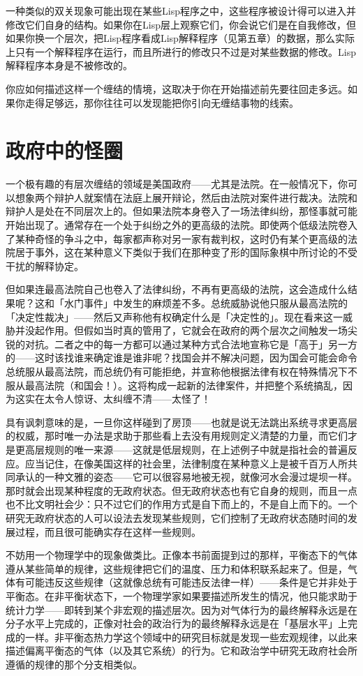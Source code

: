 \documentclass[
  12pt,
  twoside,
  openright,
  oldfontcommands,
]{memoir}
\begin{document}
一种类似的双关现象可能出现在某些Lisp程序之中，这些程序被设计得可以进入并修改它们自身的结构。如果你在Lisp层上观察它们，你会说它们是在自我修改，但如果你换一个层次，把Lisp程序看成Lisp解释程序（见第五章）的数据，那么实际上只有一个解释程序在运行，而且所进行的修改只不过是对某些数据的修改。Lisp解释程序本身是不被修改的。

你应如何描述这样一个缠结的情境，这取决于你在开始描述前先要往回走多远。如果你走得足够远，那你往往可以发现能把你引向无缠结事物的线索。

\section{政府中的怪圈}

一个极有趣的有层次缠结的领域是美国政府------尤其是法院。在一般情况下，你可以想象两个辩护人就案情在法庭上展开辩论，然后由法院对案件进行裁决。法院和辩护人是处在不同层次上的。但如果法院本身卷入了一场法律纠纷，那怪事就可能开始出现了。通常存在一个处于纠纷之外的更高级的法院。即使两个低级法院卷入了某种奇怪的争斗之中，每家都声称对另一家有裁判权，这时仍有某个更高级的法院居于事外，这在某种意义下类似于我们在那种变了形的国际象棋中所讨论的不受干扰的解释协定。

但如果连最高法院自己也卷入了法律纠纷，不再有更高级的法院，这会造成什么结果呢？这和「水门事件」中发生的麻烦差不多。总统威胁说他只服从最高法院的「决定性裁决」------然后又声称他有权确定什么是「决定性的」。现在看来这一威胁并没起作用。但假如当时真的管用了，它就会在政府的两个层次之间触发一场尖锐的对抗。二者之中的每一方都可以通过某种方式合法地宣称它是「高于」另一方的------这时该找谁来确定谁是谁非呢？找国会并不解决问题，因为国会可能会命令总统服从最高法院，而总统仍有可能拒绝，并宣称他根据法律有权在特殊情况下不服从最高法院（和国会！）。这将构成一起新的法律案件，并把整个系统搞乱，因为这实在太令人惊讶、太纠缠不清------太怪了！

具有讽刺意味的是，一旦你这样碰到了房顶------也就是说无法跳出系统寻求更高层的权威，那时唯一办法是求助于那些看上去没有用规则定义清楚的力量，而它们才是更高层规则的唯一来源------这就是低层规则，在上述例子中就是指社会的普遍反应。应当记住，在像美国这样的社会里，法律制度在某种意义上是被千百万人所共同承认的一种文雅的姿态------它可以很容易地被无视，就像河水会漫过堤坝一样。那时就会出现某种程度的无政府状态。但无政府状态也有它自身的规则，而且一点也不比文明社会少：只不过它们的作用方式是自下而上的，不是自上而下的。一个研究无政府状态的人可以设法去发现某些规则，它们控制了无政府状态随时间的发展过程，而且很可能确实存在这样一些规则。

不妨用一个物理学中的现象做类比。正像本书前面提到过的那样，平衡态下的气体遵从某些简单的规律，这些规律把它们的温度、压力和体积联系起来了。但是，气体有可能违反这些规律（这就像总统有可能违反法律一样）------条件是它并非处于平衡态。在非平衡状态下，一个物理学家如果要描述所发生的情况，他只能求助于统计力学------即转到某个非宏观的描述层次。因为对气体行为的最终解释永远是在分子水平上完成的，正像对社会的政治行为的最终解释永远是在「基层水平」上完成的一样。非平衡态热力学这个领域中的研究目标就是发现一些宏观规律，以此来描述偏离平衡态的气体（以及其它系统）的行为。它和政治学中研究无政府社会所遵循的规律的那个分支相类似。
\end{document}

